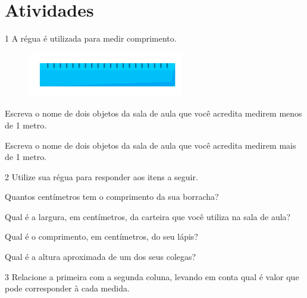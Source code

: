 \section*{Atividades}

\num{1} A régua é utilizada para medir comprimento.

\begin{figure}[htpb!]
\centering
\includegraphics[width=.7\textwidth]{./media/image41a.png}
\end{figure}

\begin{escolha}
\item Escreva o nome de dois objetos da sala de aula que você acredita
  medirem menos de 1 metro.

\item Escreva o nome de dois objetos da sala de aula que você acredita
  medirem mais de 1 metro.
\end{escolha}

\num{2} Utilize sua régua para responder aos itens a seguir.

\begin{escolha}
\item Quantos centímetros tem o comprimento da sua borracha?

\item Qual é a largura, em centímetros, da carteira que você utiliza na sala de aula?

\item Qual é o comprimento, em centímetros, do seu lápis?

\item Qual é a altura aproximada de um dos seus colegas?
\end{escolha}

\num{3} Relacione a primeira com a segunda coluna, levando em conta qual é valor que 
pode corresponder à cada medida.


